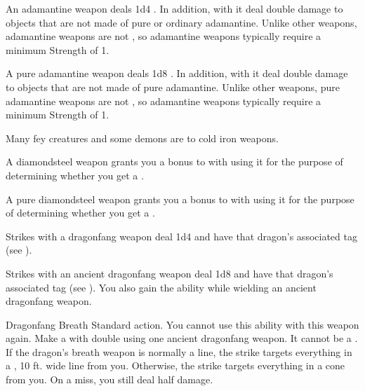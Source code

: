        An adamantine weapon deals \plus1d4 .
      In addition,  with it deal double damage to objects that are not made of pure or ordinary adamantine.
      Unlike other weapons, adamantine weapons are not , so  adamantine weapons typically require a minimum Strength of 1.

       A pure adamantine weapon deals \plus1d8 .
      In addition,  with it deal double damage to objects that are not made of pure adamantine.
      Unlike other weapons, pure adamantine weapons are not , so  adamantine weapons typically require a minimum Strength of 1.

       Many fey creatures and some demons are  to cold iron weapons.

       A diamondsteel weapon grants you a  bonus to  with  using it for the purpose of determining whether you get a .

       A pure diamondsteel weapon grants you a  bonus to  with  using it for the purpose of determining whether you get a .

       Strikes with a dragonfang weapon deal 1d4  and have that dragon's associated tag (see ).

       Strikes with an ancient dragonfang weapon deal 1d8  and have that dragon's associated tag (see ).
      You also gain the  ability while wielding an ancient dragonfang weapon.
      \begin{activeability}{Dragonfang Breath}
        \abilityusagetime Standard action.
        \abilitycost You  cannot use this ability with this weapon again.
        \rankline
        Make a  with double  using one ancient dragonfang weapon.
        It cannot be a .
        If the dragon's breath weapon is normally a line, the strike targets everything in a \arealarge, 10 ft. wide line from you.
        Otherwise, the strike targets everything in a \areamed cone from you.
        On a miss, you still deal half damage.
      \end{activeability}

